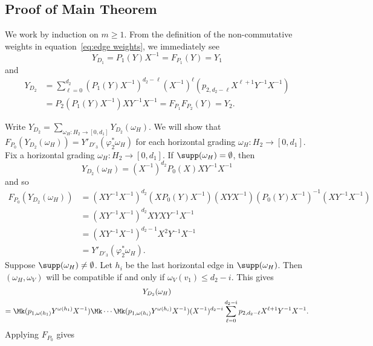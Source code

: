 \subsection{Proof of Main Theorem}
We work by induction on $m\ge1$.
From the definition of the non-commutative weights in equation~\eqref{eq:edge weights}, we immediately see 
\[Y_{D_1}=P_1(Y)X^{-1}=F_{P_1}(Y)=Y_1\]
and
\begin{align*}
 Y_{D_2}
 &=\sum\limits_{\ell=0}^{d_2} (P_1(Y)X^{-1})^{d_2-\ell}(X^{-1})^\ell(p_{2,d_2-\ell}X^{\ell+1}Y^{-1}X^{-1})\\
 &=P_2(P_1(Y)X^{-1})XY^{-1}X^{-1}=F_{P_1}F_{P_2}(Y)=Y_2.
\end{align*}

Write $Y_{D_2}=\sum\limits_{\omega_H:H_2\to[0,d_1]} Y_{D_2}(\omega_H)$.
We will show that $F_{P_0}(Y_{D_2}(\omega_H))=Y'_{D'_3}(\varphi^*_2\omega_H)$ for each horizontal grading $\omega_H:H_2\to[0,d_1]$.
Fix a horizontal grading $\omega_H:H_2\to[0,d_1]$.
If $\supp(\omega_H)=\emptyset$, then 
\[Y_{D_2}(\omega_H)=(X^{-1})^{d_2}P_0(X)XY^{-1}X^{-1}\]
and so 
\begin{align*}
 F_{P_0}(Y_{D_2}(\omega_H))
 &=(XY^{-1}X^{-1})^{d_2}(XP_0(Y)X^{-1})(XYX^{-1})(P_0(Y)X^{-1})^{-1}(XY^{-1}X^{-1})\\
 &=(XY^{-1}X^{-1})^{d_2}XYXY^{-1}X^{-1}\\
 &=(XY^{-1}X^{-1})^{d_2-1}X^2Y^{-1}X^{-1}\\
 &=Y'_{D'_3}(\varphi^*_2\omega_H).
\end{align*}
Suppose $\supp(\omega_H)\ne\emptyset$.
Let $h_i$ be the last horizontal edge in $\supp(\omega_H)$.
Then $(\omega_H,\omega_V)$ will be compatible if and only if $\omega_V(v_1)\le d_2-i$.
This gives
\begin{multline*}
Y_{D_2}(\omega_H)\\
=\Mk (p_{1,\omega(h_1)}Y^{\omega(h_1)}X^{-1})\Mk \cdots\Mk (p_{1,\omega(h_i)}Y^{\omega(h_i)}X^{-1})(X^{-1})^{d_2-i}\sum\limits_{\ell=0}^{d_2-i} p_{2,d_2-\ell}X^{\ell+1}Y^{-1}X^{-1}.
\end{multline*}
Applying $F_{P_0}$ gives
